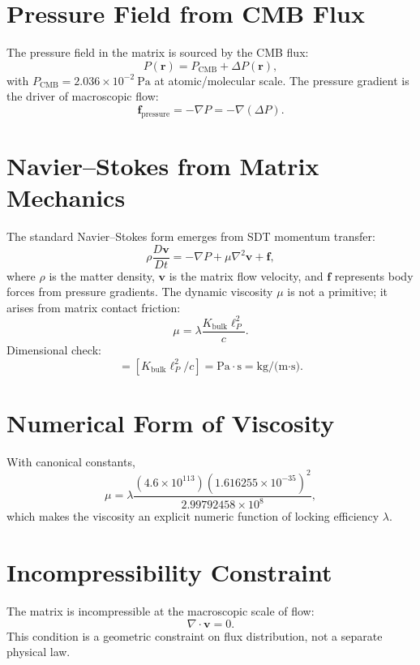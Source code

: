 \documentclass[12pt]{book}
\begin{document}
\section{Pressure Field from CMB Flux}
The pressure field in the matrix is sourced by the CMB flux:
\begin{equation}
P(\mathbf{r}) = P_{\text{CMB}} + \Delta P(\mathbf{r}),
\end{equation}
with $P_{\text{CMB}} = 2.036 \times 10^{-2}\ \text{Pa}$ at atomic/molecular scale. The pressure gradient
is the driver of macroscopic flow:
\begin{equation}
\mathbf{f}_{\text{pressure}} = -\nabla P = -\nabla(\Delta P).
\end{equation}

\section{Navier--Stokes from Matrix Mechanics}
The standard Navier--Stokes form emerges from SDT momentum transfer:
\begin{equation}
\rho \frac{D\mathbf{v}}{Dt} = -\nabla P + \mu \nabla^2 \mathbf{v} + \mathbf{f},
\end{equation}
where $\rho$ is the matter density, $\mathbf{v}$ is the matrix flow velocity, and $\mathbf{f}$ represents
body forces from pressure gradients. The dynamic viscosity $\mu$ is not a primitive; it arises from
matrix contact friction:
\begin{equation}
\mu = \lambda \frac{K_{\text{bulk}} \ell_P^2}{c}.
\end{equation}
Dimensional check:
\begin{equation}
[\mu] = [K_{\text{bulk}} \ell_P^2 / c] = \text{Pa}\cdot \text{s} = \text{kg/(m·s)}.
\end{equation}

\section{Numerical Form of Viscosity}
With canonical constants,
\begin{equation}
\mu = \lambda \frac{(4.6 \times 10^{113}) (1.616255 \times 10^{-35})^2}{2.99792458 \times 10^8},
\end{equation}
which makes the viscosity an explicit numeric function of locking efficiency $\lambda$.

\section{Incompressibility Constraint}
The matrix is incompressible at the macroscopic scale of flow:
\begin{equation}
\nabla \cdot \mathbf{v} = 0.
\end{equation}
This condition is a geometric constraint on flux distribution, not a separate physical law.
\end{document}
